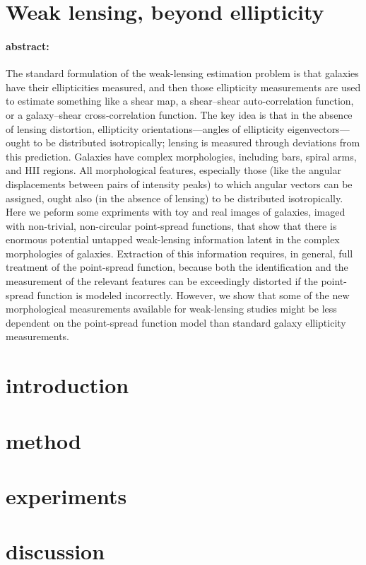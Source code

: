 \documentclass[12pt,letterpaper]{article}
\begin{document}
\sloppy\sloppypar

\section*{Weak lensing, beyond ellipticity}

\paragraph{abstract:}
The standard formulation of the weak-lensing estimation problem is that
  galaxies have their ellipticities measured,
  and then those ellipticity measurements are used to estimate something like
  a shear map, a shear--shear auto-correlation function, or a galaxy--shear cross-correlation function.
The key idea is that in the absence of lensing distortion,
  ellipticity orientations---angles of ellipticity eigenvectors---ought to be distributed isotropically;
  lensing is measured through deviations from this prediction.
Galaxies have complex morphologies,
  including bars, spiral arms, and HII regions.
All morphological features, especially those
  (like the angular displacements between pairs of intensity peaks)
  to which angular vectors can be assigned,
  ought also (in the absence of lensing) to be distributed isotropically.
Here we peform some expriments with toy and real images of galaxies,
  imaged with non-trivial, non-circular point-spread functions,
  that show that there is enormous potential untapped weak-lensing information
  latent in the complex morphologies of galaxies.
Extraction of this information requires, in general,
  full treatment of the point-spread function,
  because both the identification and the measurement of the relevant features
  can be exceedingly distorted if the point-spread function is modeled incorrectly.
However, we show that some of the new morphological measurements
  available for weak-lensing studies might be less dependent on the point-spread function model
  than standard galaxy ellipticity measurements.

\section{introduction}

\section{method}

\section{experiments}

\section{discussion}
\end{document}
